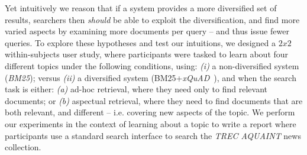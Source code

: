 Yet intuitively we reason that if a system provides a more diversified set of results, searchers then \emph{should} be able to exploit the diversification, and find more varied aspects by examining more documents per query -- and thus issue fewer queries. To explore these hypotheses and test our intuitions, we designed a $2x2$ within-subjects user study, where participants were tasked to learn about four different topics under the following conditions, using: \emph{(i)} a non-diversified system (\emph{BM25}); versus \emph{(ii)} a diversified system (BM25+\emph{xQuAD}~\cite{santos2010query_reformulations_diversification}), and when the search task is either: \emph{(a)} ad-hoc retrieval, where they need only to find relevant documents; or \emph{(b)} aspectual retrieval, where they need to find documents that are both relevant, and different -- i.e. covering new aspects of the topic. We perform our experiments in the context of learning about a topic to write a report where participants use a standard search interface to search the \emph{TREC AQUAINT} news collection. 


